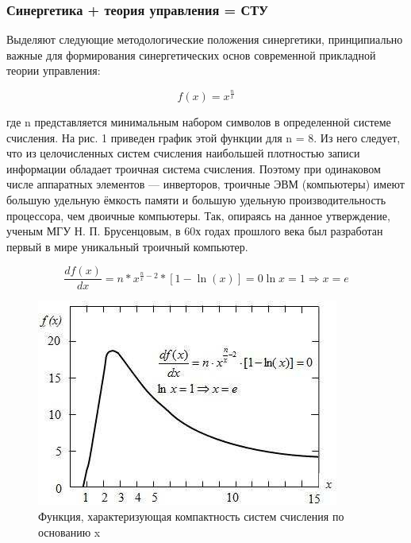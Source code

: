 \documentclass[10pt]{beamer}
\begin{document}
\begin{frame}
\transdissolve[duration=0.2] 
\frametitle{Синергетика + теория управления  = СТУ}
Выделяют следующие методологические положения синергетики, принципиально важные для формирования синергетических основ современной прикладной теории управления:
\begin{block}{}
\begin{equation}
f(x) = x^{\frac{n}{x}}
\end{equation}
	
где n представляется минимальным набором символов в определенной системе счисления. На рис. 1 приведен график этой функции для n = 8. Из него следует, что из целочисленных систем счисления наибольшей плотностью записи информации обладает троичная система счисления. Поэтому при одинаковом числе аппаратных элементов — инверторов, троичные ЭВМ (компьютеры) имеют большую удельную ёмкость памяти и большую удельную производительность процессора, чем двоичные компьютеры. Так, опираясь на данное утверждение, ученым МГУ Н. П. Брусенцовым, в 60х годах прошлого века был разработан первый в мире уникальный троичный компьютер.	
	


\end{block}
\end{frame} 


\begin{frame}[shrink=20,fragile]
\transdissolve[duration=0.2]
\begin{equation}
\frac{df(x)}{dx} = n*x^{\frac{n}{x}-2}*[1-\ln(x)]=0
\ln x = 1 \Rightarrow x = e
\end{equation}
\begin{block}{}
\begin{figure}
\includegraphics[scale=0.85]{pics/1.jpeg}
\caption{Функция, характеризующая компактность систем счисления по основанию x}
\end{figure}
\end{block}   

\end{frame}
\end{document}
